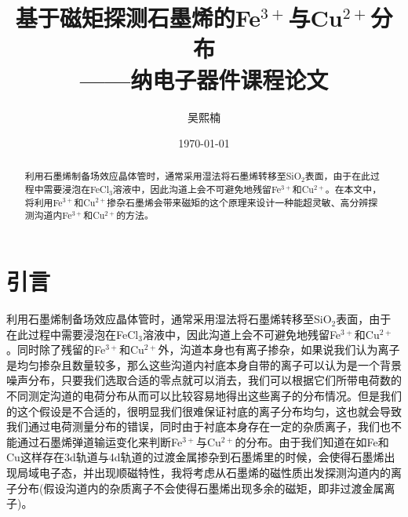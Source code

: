 \documentclass{phyasgn}\usepackage{nag}
\title{
  {基于磁矩探测石墨烯的Fe$^{3+}$与Cu$^{2+}$分布}\\[-8pt]
  {\normalsize ——纳电子器件课程论文}
}
\author{吴熙楠}
\date{\today}
\begin{document}
\maketitle

\begin{abstract}
利用石墨烯制备场效应晶体管时，通常采用湿法将石墨烯转移至SiO$_2$表面，由于在此过程中需要浸泡在FeCl$_3$溶液中，因此沟道上会不可避免地残留Fe$^{3+}$和Cu$^{2+}$。在本文中，将利用Fe$^{3+}$和Cu$^{2+}$掺杂石墨烯会带来磁矩的这个原理来设计一种能超灵敏、高分辨探测沟道内Fe$^{3+}$和Cu$^{2+}$的方法。
\end{abstract}

\tableofcontents

\section{引言}
\par 利用石墨烯制备场效应晶体管时，通常采用湿法将石墨烯转移至SiO$_2$表面，由于在此过程中需要浸泡在FeCl$_3$溶液中，因此沟道上会不可避免地残留Fe$^{3+}$和Cu$^{2+}$。同时除了残留的Fe$^{3+}$和Cu$^{2+}$外，沟道本身也有离子掺杂，如果说我们认为离子是均匀掺杂且数量较多，那么这些沟道内衬底本身自带的离子可以认为是一个背景噪声分布，只要我们选取合适的零点就可以消去，我们可以根据它们所带电荷数的不同测定沟道的电荷分布从而可以比较容易地得出这些离子的分布情况。但是我们的这个假设是不合适的，很明显我们很难保证衬底的离子分布均匀，这也就会导致我们通过电荷测量分布的错误，同时由于衬底本身存在一定的杂质离子，我们也不能通过石墨烯弹道输运变化来判断Fe$^{3+}$与Cu$^{2+}$的分布。由于我们知道在如Fe和Cu这样存在3d轨道与4d轨道的过渡金属掺杂到石墨烯里的时候，会使得石墨烯出现局域电子态，并出现顺磁特性\cite{sadki2019spontaneous}，我将考虑从石墨烯的磁性质出发探测沟道内的离子分布(假设沟道内的杂质离子不会使得石墨烯出现多余的磁矩，即非过渡金属离子)。
\end{document}
